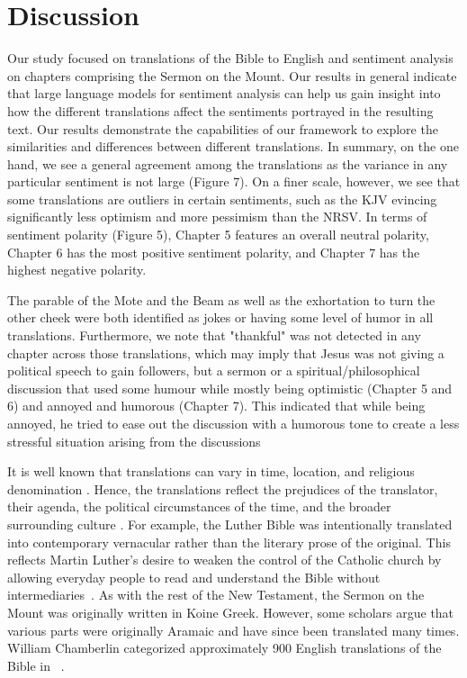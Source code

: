 \documentclass[5p,times]{elsarticle}
\begin{document}
 

\section{Discussion}




Our study focused on translations of the Bible to English and sentiment analysis on chapters comprising the Sermon on the Mount.  Our results in general indicate that large language models for sentiment analysis can help us gain insight into how the different translations affect the sentiments portrayed in the resulting text.  Our results demonstrate the capabilities of our framework to explore the similarities and differences between different translations.  In summary, on the one hand, we see a general agreement among the translations as the variance in any particular sentiment is not large (Figure 7). On a finer scale, however, we see that some translations are outliers in certain sentiments, such as the KJV evincing significantly less optimism and more pessimism than the NRSV. In terms of sentiment polarity (Figure 5), Chapter 5 features an overall neutral polarity, Chapter 6 has the most positive sentiment polarity, and Chapter 7 has the highest negative polarity. 

 The parable of the Mote and the Beam as well as the exhortation to turn the other cheek were both identified as jokes or having some level of humor in all translations. Furthermore, we note that "thankful" was not detected in any chapter across those translations, which may imply that Jesus was not giving a political speech to gain followers, but a sermon or a spiritual/philosophical discussion that used some humour while mostly being optimistic (Chapter 5 and 6) and annoyed and humorous (Chapter 7). This indicated that while being annoyed, he tried to ease out the discussion with a humorous tone to create a less stressful situation arising from the discussions 

 It is well known that translations can vary in time, location, and religious denomination \cite{strauss2010distorting}. Hence, the translations reflect the prejudices of the translator, their agenda, the political circumstances of the time, and the broader surrounding culture \cite{mojola2014old}. For example, the Luther Bible \cite{lobenstein2017martin} was intentionally translated into contemporary vernacular rather than the literary prose of the original. This reflects Martin Luther's desire to weaken the control of the Catholic church by allowing everyday people to read and understand the Bible without intermediaries~\cite{dickens1974luther}.  As with the rest of the New Testament, the Sermon on the Mount was originally written in Koine Greek. However, some scholars argue that various parts were originally Aramaic \cite{stuckenbruck1991approach} and have since been translated many times. William Chamberlin categorized approximately 900 English translations of the Bible in ~\cite{chamberlin1991catalogue}. 
\end{document}
